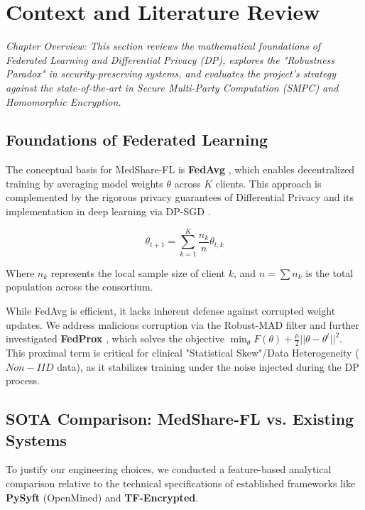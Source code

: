 \documentclass[10pt, a4paper, twocolumn]{article}
\begin{document}
\section{Context and Literature Review}
\label{sec:litreview}

\textit{Chapter Overview: This section reviews the mathematical foundations of Federated Learning and Differential Privacy (DP), explores the "Robustness Paradox" in security-preserving systems, and evaluates the project's strategy against the state-of-the-art in Secure Multi-Party Computation (SMPC) and Homomorphic Encryption.}

\subsection{Foundations of Federated Learning}
The conceptual basis for MedShare-FL is \textbf{FedAvg} \cite{mcmahan2017}, which enables decentralized training by averaging model weights $\theta$ across $K$ clients. This approach is complemented by the rigorous privacy guarantees of Differential Privacy \cite{dwork2006} and its implementation in deep learning via DP-SGD \cite{abadi2016}.

\begin{equation}
    \theta_{t+1} = \sum_{k=1}^K \frac{n_k}{n} \theta_{t,k}
\end{equation}

Where $n_k$ represents the local sample size of client $k$, and $n = \sum n_k$ is the total population across the consortium.

While FedAvg is efficient, it lacks inherent defense against corrupted weight updates. We address malicious corruption via the Robust-MAD filter and further investigated \textbf{FedProx} \cite{li2020}, which solves the objective $\min_{\theta} F(\theta) + \frac{\mu}{2} ||\theta - \theta^t||^2$. This proximal term is critical for clinical "Statistical Skew"/Data Heterogeneity ($Non-IID$ data), as it stabilizes training under the noise injected during the DP process.

\subsection{SOTA Comparison: MedShare-FL vs. Existing Systems}
To justify our engineering choices, we conducted a feature-based analytical comparison relative to the technical specifications of established frameworks like \textbf{PySyft}\cite{ryffel2018} (OpenMined) and \textbf{TF-Encrypted}\cite{dahl2018}.
\end{document}
